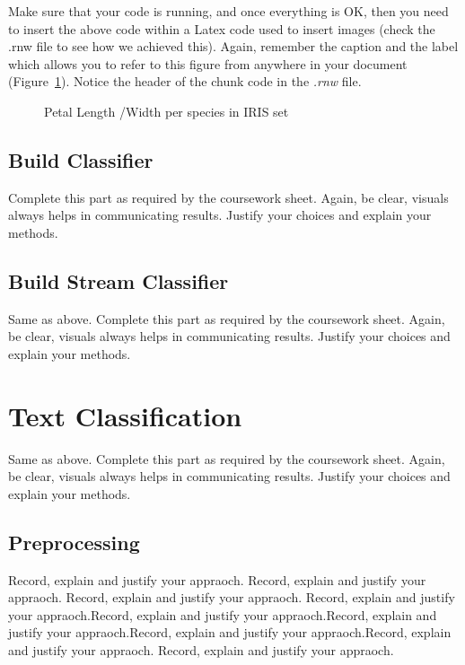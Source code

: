 \documentclass[10pt]{article}
\begin{document}
Make sure that your code is running, and once everything is OK, then you need to insert the above code within a Latex code used to insert images (check the .rnw file to see how we achieved this). Again, remember the caption and the label which allows you to refer to this figure from anywhere in your document (Figure~\ref{fig1}). Notice the header of the chunk code in the \textit{.rnw} file. 

\begin{figure}[H]
\begin{center}

\caption {Petal Length /Width per species in IRIS set}
\label{fig1}
\end {center}
\end {figure}




\subsection{Build Classifier}


Complete this part as required by the coursework sheet. Again, be clear, visuals always helps in communicating results. Justify your choices and explain your methods. 




\subsection{Build Stream Classifier}

Same as above. Complete this part as required by the coursework sheet. Again, be clear, visuals always helps in communicating results. Justify your choices and explain your methods. 




\section {Text Classification}

Same as above. Complete this part as required by the coursework sheet. Again, be clear, visuals always helps in communicating results. Justify your choices and explain your methods. 


\subsection{Preprocessing}

Record, explain and justify your appraoch. Record, explain and justify your appraoch. 
Record, explain and justify your appraoch. Record, explain and justify your appraoch.Record, explain and justify your appraoch.Record, explain and justify your appraoch.Record, explain and justify your appraoch.Record, explain and justify your appraoch. 
Record, explain and justify your appraoch. 
\end{document}

